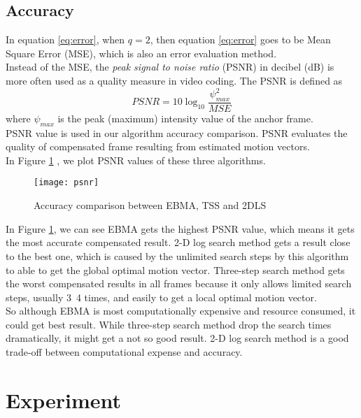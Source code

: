\documentclass[a4paper, twocolumn]{article}
\begin{document}
	\subsection{Accuracy}
	In equation \ref{eq:error}, when $ q = 2 $, then equation \ref{eq:error} goes to be Mean Square Error (MSE), which is also an error evaluation method. \\
	Instead of the MSE, the \textit{peak signal to noise ratio} (PSNR) in decibel (dB) is more often used as a quality measure in video coding. The PSNR is defined as 
	\begin{equation}
		PSNR = 10 \log_{10} \frac{\psi_{max}^2}{MSE}
	\end{equation}
	where $ \psi_{max} $ is the peak (maximum) intensity value of the anchor frame.\\
	PSNR value is used in our algorithm accuracy comparison. PSNR evaluates the quality of compensated frame resulting from estimated motion vectors. \\
	In Figure \ref{fig:psnr} , we plot PSNR values of these three algorithms. 
	\begin{figure}[h]
	\centering
	\texttt{[image: psnr]}
	\caption{Accuracy comparison between EBMA, TSS and 2DLS}
	\label{fig:psnr}
	\end{figure}

	\noindent
	In Figure \ref{fig:psnr}, we can see EBMA gets the highest PSNR value, which means it gets the most accurate compensated result. 2-D log search method gets a result close to the best one, which is caused by the unlimited search steps by this algorithm to able to get the global optimal motion vector. Three-step search method gets the worst compensated results in all frames because it only allows limited search steps, usually 3~4 times, and easily to get a local optimal motion vector.\\
	So although EBMA is most computationally expensive and resource consumed, it could get best result. While three-step search method drop the search times dramatically, it might get a not so good result. 2-D log search method is a good trade-off between computational expense and accuracy.
	
	
	\section{Experiment}
\end{document}
